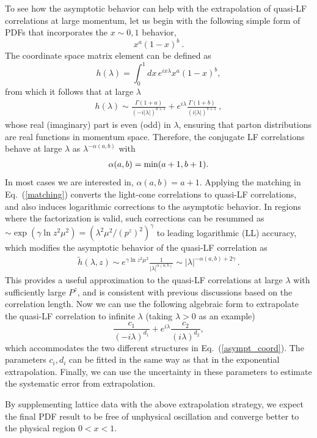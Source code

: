 To see how the asymptotic behavior can help with the extrapolation of quasi-LF correlations at large momentum, let us begin with the following simple form of PDFs that incorporates the $x\sim 0, 1$ behavior,
\begin{equation}
     x^a (1-x)^b \ .
\end{equation}
The coordinate space matrix element can be defined as
\begin{equation}
h(\lambda)=\int_0^1 dx \, e^{i x\lambda}x^a (1-x)^b,
\end{equation}
from which it follows that at large $\lambda$
\begin{align}\label{asympt_coord}
h(\lambda)\sim\frac{\Gamma(1+a)}{(-i|\lambda|)^{a+1}}+e^{i\lambda}\frac{\Gamma(1+b)}{(i|\lambda|)^{b+1}} \ ,
\end{align}
whose real (imaginary) part is even (odd) in $\lambda$, ensuring that parton distributions are real functions in momentum space. Therefore, the conjugate LF correlations behave at large $\lambda$ as $\lambda^{-\alpha(a,b)}$ with
\begin{align}
\alpha(a,b)=\text{\rm min}(a+1,b+1).
\end{align}
In most cases we are interested in, $\alpha(a,b)=a+1$. Applying the matching in Eq.~(\ref{matching}) converts the light-cone correlations to quasi-LF correlations, and also induces logarithmic corrections to the asymptotic behavior. In regions where the factorization is valid, such corrections can be resummed as $\sim \exp(\gamma \ln z^2\mu^2)=(\lambda^2\mu^2/(p^z)^2)^\gamma$ to leading logarithmic (LL) accuracy, which modifies the asymptotic behavior of the quasi-LF correlation as
\begin{align}\label{asymphtilde}
\tilde h(\lambda,z)\sim e^{\gamma \ln z^2\mu^2}\frac{1}{|\lambda|^{\alpha(a,b)}}\sim |\lambda|^{-\alpha(a,b)+2\gamma }  \,.
\end{align}
This provides a useful approximation to the quasi-LF correlations at large $\lambda$ with sufficiently large $P^z$, and is consistent with previous discussions based on the correlation length.
Now we can use the following algebraic form to extrapolate the quasi-LF correlation to infinite $\lambda$ (taking $\lambda>0$ as an example)
\begin{equation}\label{extrap}
\frac{c_1}{(-i \lambda)^{d_1}}+e^{i\lambda}\frac{c_2}{(i \lambda)^{d_2}},
\end{equation}
which accommodates the two different structures in Eq.~(\ref{asympt_coord}). The parameters $c_i, d_i$ can be fitted in the same way as that in the exponential extrapolation. Finally, we can use the uncertainty in these parameters to estimate the systematic error from extrapolation.





By supplementing lattice data with the above extrapolation strategy, we expect the final PDF result to be free of unphysical oscillation and converge better to the physical region $0<x<1$.
